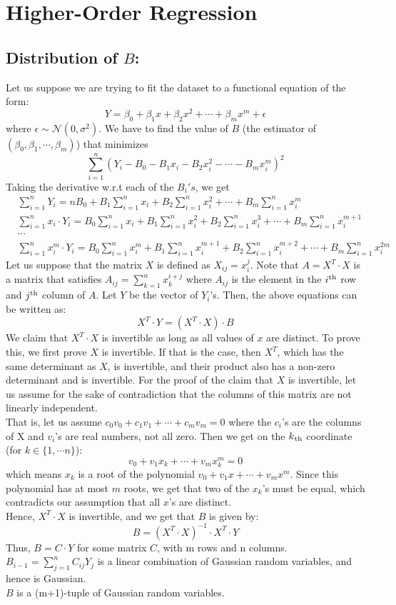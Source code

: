 \section{Higher-Order Regression}
\subsection{Distribution of $B$: }
Let us suppose we are trying to fit the dataset to a functional equation of the form:
\[
    Y = \beta_0 + \beta_1 x + \beta_2 x^2 + \cdots + \beta_m x^m + \epsilon
\]
where $\epsilon \sim \mathcal{N}(0, \sigma^2)$.
We have to find the value of $B$ (the estimator of $(\beta_0, \beta_1, \cdots, \beta_m)$) that minimizes
\[
    \sum_{i=1}^n (Y_i - B_0 - B_1 x_i - B_2 x_i^2 - \cdots - B_m x_i^m)^2
\]  
Taking the derivative w.r.t each of the $B_i's$, we get 
\begin{align*}
    &\sum_{i=1}^{n} Y_i = nB_0 + B_1 \sum_{i=1}^{n} x_i + B_2 \sum_{i=1}^{n} x_i^2 + \cdots + B_m \sum_{i=1}^{n} x_i^m\\
    &\sum_{i=1}^{n} x_i\cdot Y_i = B_0 \sum_{i=1}^{n} x_i + B_1 \sum_{i=1}^{n} x_i^2 + B_2 \sum_{i=1}^{n} x_i^3 + \cdots + B_m \sum_{i=1}^{n} x_i^{m+1}\\
    &\cdots\\
    &\sum_{i=1}^{n} x_i^m\cdot Y_i = B_0 \sum_{i=1}^{n} x_i^m + B_1 \sum_{i=1}^{n} x_i^{m+1} + B_2 \sum_{i=1}^{n} x_i^{m+2} + \cdots + B_m \sum_{i=1}^{n} x_i^{2m}
\end{align*}
Let us suppose that the matrix $X$ is defined as $X_{ij}=x_i^j$. Note that $A=X^T\cdot X$ is a matrix that satisfies $A_{ij}=\sum_{k=1}^n x_k^{i+j}$ where $A_{ij}$ is the element in the $i\textsuperscript{th}$ row and $j\textsuperscript{th}$ column of $A$. Let $Y$ be the vector of $Y_i$'s. Then, the above equations can be written as:
\[
    X^T\cdot Y = (X^T\cdot X)\cdot B
\]
We claim that $X^T \cdot X$ is invertible as long as all values of $x$ are distinct. To prove this, we first prove $X$ is invertible. If that is the case, then $X^T$, which has the same determinant as $X$, is invertible, and their product also has a non-zero determinant and is invertible. For the proof of the claim that $X$ is invertible, let us assume for the sake of contradiction that the columns of this matrix are not linearly independent.\\
That is, let us assume $c_0 v_0 + c_1 v_1 + \cdots + c_m v_m = 0$ where the $c_i$'s are the columns of X and $v_i$'s are real numbers, not all zero. Then we get on the $k\textsubscript{th}$ coordinate (for $k \in \{1,\cdots n\}$):
\[
    v_0 + v_1 x_k + \cdots + v_m x_k^m = 0
\]
which means $x_k$ is a root of the polynomial $v_0 + v_1 x + \cdots + v_m x^m$. Since this polynomial has at most $m$ roots, we get that two of the $x_k$'s must be equal, which contradicts our assumption that all $x$'s are distinct.\\
Hence, $X^T \cdot X$ is invertible, and we get that $B$ is given by:
\[
    B = (X^T\cdot X)^{-1}\cdot X^T\cdot Y
\]
Thus, $B = C\cdot Y$ for some matrix $C$, with m rows and n columns.\\
$B_{i-1} = \sum_{j=1}^{n} C_{ij} Y_j$ is a linear combination of Gaussian random variables, and hence is Gaussian.\\
$B$ is a (m+1)-tuple of Gaussian random variables.

